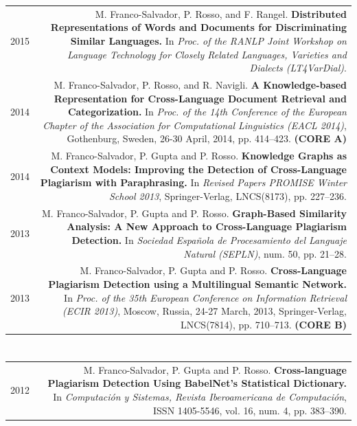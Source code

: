 \documentclass[10pt]{article}
\begin{document}
\begin{tabular}{L!{\VRule}R}
	2015&M. Franco-Salvador, P. Rosso, and F. Rangel. \textbf{Distributed Representations of Words and Documents for Discriminating Similar Languages.}
	In \emph{Proc. of the RANLP Joint Workshop on Language Technology for Closely Related Languages, Varieties and Dialects (LT4VarDial)}. \vspace{5pt}\\
	2014&M. Franco-Salvador, P. Rosso, and R. Navigli. \textbf{A Knowledge-based Representation for Cross-Language Document Retrieval and Categorization.}
	In \emph{Proc. of the 14th Conference of the European Chapter of the Association for Computational Linguistics (EACL 2014)}, Gothenburg, Sweden, 26-30 April, 2014, pp. 414--423. \textbf{(CORE A)} \vspace{5pt}\\
	2014&M. Franco-Salvador, P. Gupta and P. Rosso. \textbf{Knowledge Graphs as Context Models: Improving the Detection of Cross-Language Plagiarism with Paraphrasing.}
	In \emph{Revised Papers PROMISE Winter School 2013}, Springer-Verlag, LNCS(8173), pp. 227--236.\vspace{5pt}\\
	2013&M. Franco-Salvador, P. Gupta and P. Rosso. \textbf{Graph-Based Similarity Analysis: A New Approach to Cross-Language Plagiarism Detection.}
	In \emph{Sociedad Espa{\~n}ola de Procesamiento del Languaje Natural (SEPLN)}, num. 50, pp. 21--28. \vspace{5pt}\\
	2013&M. Franco-Salvador, P. Gupta and P. Rosso. \textbf{Cross-Language Plagiarism Detection using a Multilingual Semantic Network.}
	In \emph{Proc. of the 35th European Conference on Information Retrieval (ECIR 2013)}, Moscow, Russia, 24-27 March, 2013, Springer-Verlag, LNCS(7814), pp. 710--713. \textbf{(CORE B)}\vspace{5pt}\\
\end{tabular}

\section*{}
\begin{tabular}{L!{\VRule}R}
	2012&M. Franco-Salvador, P. Gupta and P. Rosso. \textbf{Cross-language Plagiarism Detection Using BabelNet's Statistical Dictionary.}
	In \emph{Computaci{\'o}n y Sistemas, Revista Iberoamericana de Computaci{\'o}n}, ISSN 1405-5546, vol. 16, num. 4, pp. 383--390.\vspace{5pt}\\
\end{tabular}
\end{document}
